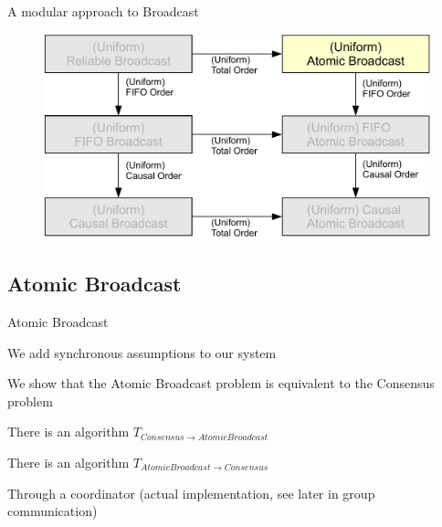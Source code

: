\begin{frame}{A modular approach to Broadcast}

\begin{figure}
	\includegraphics[width=\textwidth]{rb-modular-summary}
\end{figure}

\end{frame}

\subsection{Atomic Broadcast}

\begin{frame}{Atomic Broadcast}
	

\BEL
\item We add synchronous assumptions to our system
\item  We show that the Atomic Broadcast problem is \alert{equivalent} to the Consensus problem
\BI
\item There is an algorithm $T_{\mathit{Consensus} \rightarrow \mathit{Atomic Broadcast}}$
\item There is an algorithm $T_{\mathit{Atomic Broadcast} \rightarrow \mathit{Consensus}}$
\EI
\item Through a coordinator  (actual implementation, see later in group communication)
\EEL

\end{frame}


